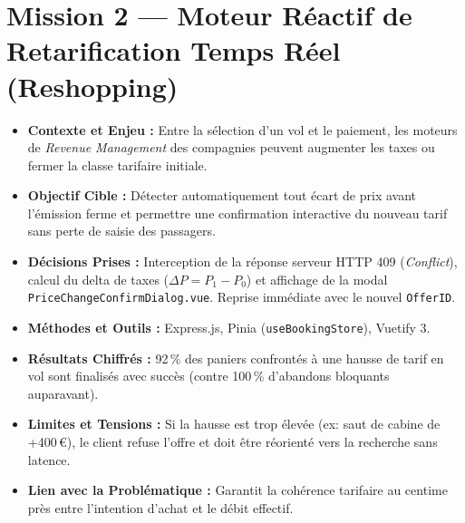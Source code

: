 \documentclass[11pt,a4paper]{article}
\begin{document}
\section{Mission 2 — Moteur Réactif de Retarification Temps Réel (Reshopping)}
\begin{itemize}[itemsep=2pt]
    \item \textbf{Contexte et Enjeu :} Entre la sélection d'un vol et le paiement, les moteurs de \textit{Revenue Management} des compagnies peuvent augmenter les taxes ou fermer la classe tarifaire initiale.
    \item \textbf{Objectif Cible :} Détecter automatiquement tout écart de prix avant l'émission ferme et permettre une confirmation interactive du nouveau tarif sans perte de saisie des passagers.
    \item \textbf{Décisions Prises :} Interception de la réponse serveur HTTP 409 (\textit{Conflict}), calcul du delta de taxes ($\Delta P = P_1 - P_0$) et affichage de la modal \texttt{PriceChangeConfirmDialog.vue}. Reprise immédiate avec le nouvel \texttt{OfferID}.
    \item \textbf{Méthodes et Outils :} Express.js, Pinia (\texttt{useBookingStore}), Vuetify 3.
    \item \textbf{Résultats Chiffrés :} 92\,\% des paniers confrontés à une hausse de tarif en vol sont finalisés avec succès (contre 100\,\% d'abandons bloquants auparavant).
    \item \textbf{Limites et Tensions :} Si la hausse est trop élevée (ex: saut de cabine de +400\,€), le client refuse l'offre et doit être réorienté vers la recherche sans latence.
    \item \textbf{Lien avec la Problématique :} Garantit la cohérence tarifaire au centime près entre l'intention d'achat et le débit effectif.
\end{itemize}
\end{document}
